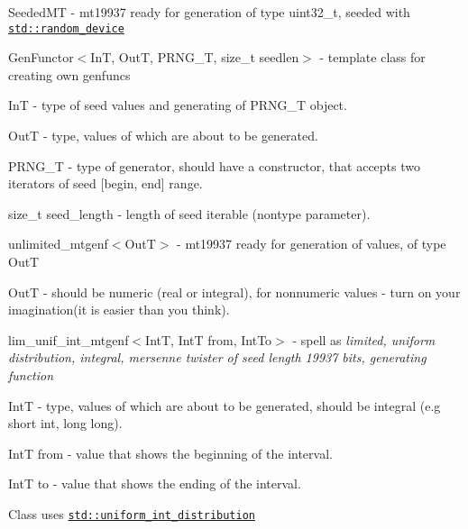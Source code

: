 \begin{DoxyItemize}
\item {\ttfamily Seeded\+MT} -\/ mt19937 ready for generation of type {\ttfamily uint32\+\_\+t}, seeded with \href{https://en.cppreference.com/w/cpp/numeric/random/random_device}{\tt {\ttfamily std\+::random\+\_\+device}}
\item {\ttfamily Gen\+Functor$<$InT, OutT, P\+R\+N\+G\+\_\+T, size\+\_\+t seedlen$>$} -\/ template class for creating own genfuncs
\begin{DoxyItemize}
\item {\ttfamily InT} -\/ type of seed values and generating of {\ttfamily P\+R\+N\+G\+\_\+T} object.
\item {\ttfamily OutT} -\/ type, values of which are about to be generated.
\item {\ttfamily P\+R\+N\+G\+\_\+T} -\/ type of generator, should have a constructor, that accepts two iterators of seed {\ttfamily \mbox{[}begin, end\mbox{]}} range.
\item {\ttfamily size\+\_\+t seed\+\_\+length} -\/ length of seed iterable (nontype parameter).
\end{DoxyItemize}
\item {\ttfamily unlimited\+\_\+mtgenf$<$OutT$>$} -\/ {\ttfamily mt19937} ready for generation of values, of type {\ttfamily OutT}
\begin{DoxyItemize}
\item {\ttfamily OutT} -\/ should be numeric (real or integral), for nonnumeric values -\/ turn on your imagination(it is easier than you think).
\end{DoxyItemize}
\item {\ttfamily lim\+\_\+unif\+\_\+int\+\_\+mtgenf$<$IntT, IntT from, Int\+To$>$} -\/ spell as {\itshape limited, uniform distribution, integral, mersenne twister of seed length 19937 bits, generating function}
\begin{DoxyItemize}
\item {\ttfamily IntT} -\/ type, values of which are about to be generated, should be integral (e.\+g {\ttfamily short int}, {\ttfamily long long}).
\item {\ttfamily IntT from} -\/ value that shows the beginning of the interval.
\item {\ttfamily IntT to} -\/ value that shows the ending of the interval.
\end{DoxyItemize}
\end{DoxyItemize}

Class uses \href{https://en.cppreference.com/w/cpp/numeric/random/uniform_int_distribution}{\tt {\ttfamily std\+::uniform\+\_\+int\+\_\+distribution}}

